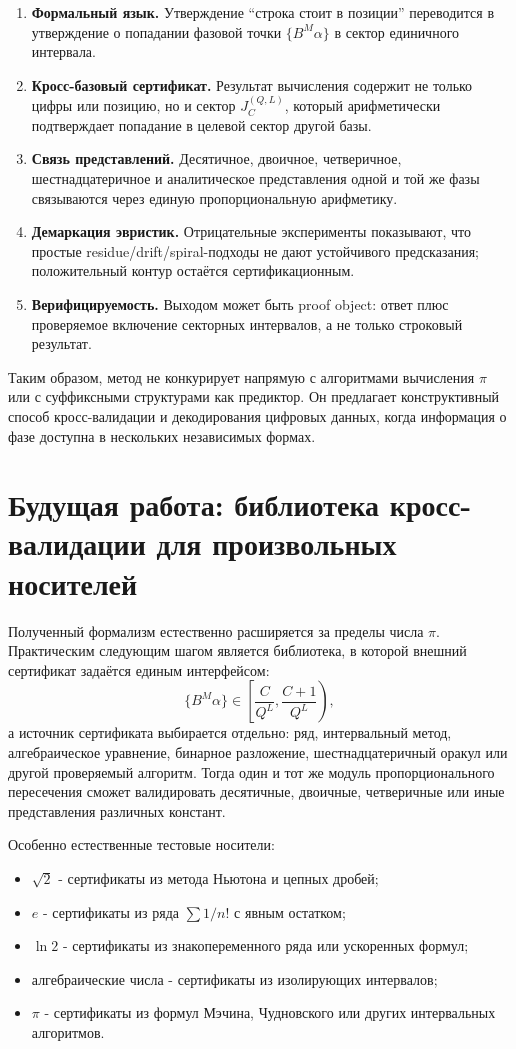 \documentclass[11pt,a4paper]{article}
\begin{document}
\begin{enumerate}[leftmargin=2em]
  \item \textbf{Формальный язык.}  Утверждение ``строка стоит в позиции'' переводится в утверждение о попадании фазовой точки $\{B^M\alpha\}$ в сектор единичного интервала.
  \item \textbf{Кросс-базовый сертификат.}  Результат вычисления содержит не только цифры или позицию, но и сектор $J_C^{(Q,L)}$, который арифметически подтверждает попадание в целевой сектор другой базы.
  \item \textbf{Связь представлений.}  Десятичное, двоичное, четверичное, шестнадцатеричное и аналитическое представления одной и той же фазы связываются через единую пропорциональную арифметику.
  \item \textbf{Демаркация эвристик.}  Отрицательные эксперименты показывают, что простые residue/drift/spiral-подходы не дают устойчивого предсказания; положительный контур остаётся сертификационным.
  \item \textbf{Верифицируемость.}  Выходом может быть proof object: ответ плюс проверяемое включение секторных интервалов, а не только строковый результат.
\end{enumerate}

Таким образом, метод не конкурирует напрямую с алгоритмами вычисления $\pi$ или с суффиксными структурами как предиктор.  Он предлагает конструктивный способ кросс-валидации и декодирования цифровых данных, когда информация о фазе доступна в нескольких независимых формах.

\section{Будущая работа: библиотека кросс-валидации для произвольных носителей}

Полученный формализм естественно расширяется за пределы числа $\pi$.  Практическим следующим шагом является библиотека, в которой внешний сертификат задаётся единым интерфейсом:
\[
  \{B^M\alpha\}\in \left[\frac{C}{Q^L},\frac{C+1}{Q^L}\right),
\]
а источник сертификата выбирается отдельно: ряд, интервальный метод, алгебраическое уравнение, бинарное разложение, шестнадцатеричный оракул или другой проверяемый алгоритм.  Тогда один и тот же модуль пропорционального пересечения сможет валидировать десятичные, двоичные, четверичные или иные представления различных констант.

Особенно естественные тестовые носители:
\begin{itemize}[leftmargin=2em]
  \item $\sqrt2$ - сертификаты из метода Ньютона и цепных дробей;
  \item $e$ - сертификаты из ряда $\sum 1/n!$ с явным остатком;
  \item $\ln2$ - сертификаты из знакопеременного ряда или ускоренных формул;
  \item алгебраические числа - сертификаты из изолирующих интервалов;
  \item $\pi$ - сертификаты из формул Мэчина, Чудновского или других интервальных алгоритмов.
\end{itemize}
\end{document}
